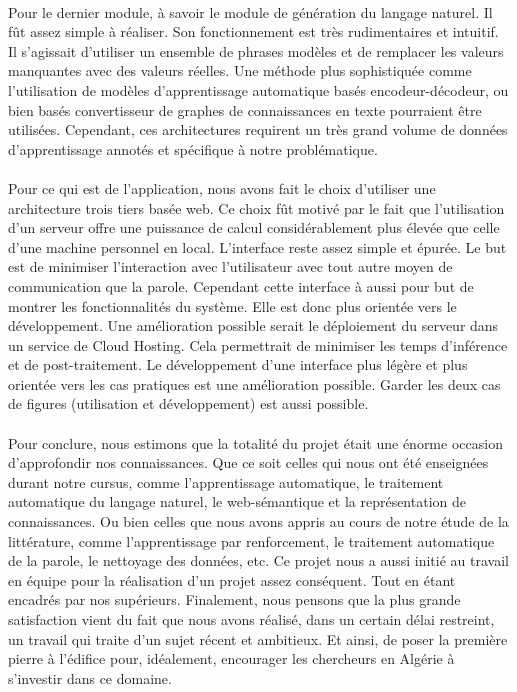 \paragraph{}
Pour le dernier module, à savoir le module de génération du langage naturel. Il fût assez simple à réaliser. Son fonctionnement est très rudimentaires et intuitif. Il s'agissait d'utiliser un ensemble de phrases modèles et de remplacer les valeurs manquantes avec des valeurs réelles. Une méthode plus sophistiquée comme l'utilisation de modèles d'apprentissage automatique basés encodeur-décodeur, ou bien basés convertisseur de graphes de connaissances en texte pourraient être utilisées. Cependant, ces architectures requirent un très grand volume de données d'apprentissage annotés et spécifique à notre problématique.

\paragraph{}
Pour ce qui est de l'application, nous avons fait le choix d'utiliser une architecture trois tiers basée web. Ce choix fût motivé par le fait que l'utilisation d'un serveur offre une puissance de calcul considérablement plus élevée que celle d'une machine personnel en local. L'interface reste assez simple et épurée. Le but est de minimiser l'interaction avec l'utilisateur avec tout autre moyen de communication que la parole. Cependant cette interface à aussi pour but de montrer les fonctionnalités du système. Elle est donc plus orientée vers le développement.
Une amélioration possible serait le déploiement du serveur dans un service de Cloud Hosting. Cela permettrait de minimiser les temps d'inférence et de post-traitement. Le développement d'une interface plus légère et plus orientée vers les cas pratiques est une amélioration possible. Garder les deux cas de figures (utilisation et développement) est aussi possible.

\paragraph{}
Pour conclure, nous estimons que la totalité du projet était une énorme occasion d'approfondir nos connaissances. Que ce soit celles qui nous ont été enseignées durant notre cursus, comme l'apprentissage automatique, le traitement automatique du langage naturel, le web-sémantique et la représentation de connaissances. Ou bien celles que nous avons appris au cours de notre étude de la littérature, comme l'apprentissage par renforcement, le traitement automatique de la parole, le nettoyage des données, etc. Ce projet nous a aussi initié au travail en équipe pour la réalisation d'un projet assez conséquent. Tout en étant encadrés par nos supérieurs.
Finalement, nous pensons que la plus grande satisfaction vient du fait que nous avons réalisé, dans un certain délai restreint, un travail qui traite d'un sujet récent et ambitieux. Et ainsi, de poser la première pierre à l'édifice pour, idéalement, encourager les chercheurs en Algérie à s'investir dans ce domaine. 

